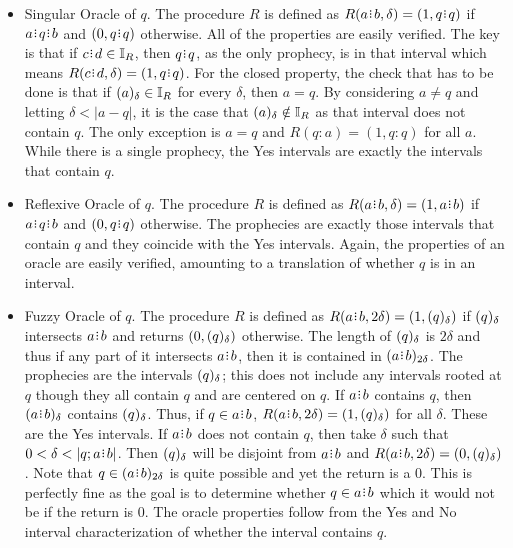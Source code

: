 \documentclass[12pt]{article}
\begin{document}
\begin{itemize}
    \item Singular Oracle of $q$. The procedure $R$ is defined as $R(a \rint b,\delta) = (1, q \rint q)$ if $a \rint q \rint b$ and $(0, q \rint q)$ otherwise. All of the properties are easily verified. The key is that if $c \rint d \in \mathbb{I}_R$, then $q \rint q$, as the only prophecy, is in that interval which means $R(c \rint d, \delta) = (1, q \rint q)$. For the closed property, the check that has to be done is that if $(a)_{\delta} \in \mathbb{I}_R$ for every $\delta$, then $a = q$. By considering $a \neq q$ and letting $\delta < |a-q|$, it is the case that $(a)_{\delta} \notin \mathbb{I}_R$ as that interval does not contain $q$. The only exception is $a = q$ and $R(q:a) =(1, q:q)$ for all $a$. While there is a single prophecy, the Yes intervals are exactly the intervals that contain $q$. 

    \item Reflexive Oracle of $q$. The procedure $R$ is defined as $R(a\rint b, \delta) = (1, a\rint b)$ if $a\rint q \rint b$ and $(0, q \rint q)$ otherwise. The prophecies are exactly those intervals that contain $q$ and they coincide with the Yes intervals. Again, the properties of an oracle are easily verified, amounting to a translation of whether $q$ is in  an interval.
    
    \item Fuzzy Oracle of $q$. The procedure $R$ is defined as $R(a\rint b, 2\delta) = (1, \halo{q})$ if $(q)_{\delta}$ intersects $a\rint b$ and returns $(0, (q)_{\delta})$ otherwise. The length of $(q)_{\delta}$ is $2\delta$ and thus if any part of it intersects $a \rint b$, then it is contained in $\halo[2\delta]{a \rint b}$. The prophecies are the intervals $(q)_{\delta}$; this does not include any intervals rooted at $q$ though they all contain $q$ and are centered on $q$. If $a \rint b$ contains $q$, then $\halo{a \rint b}$ contains $(q)_{\delta}$. Thus, if $q \in a \rint b$, $R(a \rint b, 2\delta) = (1, \halo{q})$ for all $\delta$. These are the Yes intervals. If $a \rint b$ does not contain $q$, then take $\delta$ such that $0 < \delta < |q; a \rint b|$. Then $(q)_{\delta}$ will be disjoint from $a \rint b$ and $R(a \rint b, 2\delta) = (0, \halo{q})$. Note that $q \in \halo[2\delta]{a \rint b}$ is quite possible and yet the return is a $0$. This is perfectly fine as the goal is to determine whether $q \in a \rint b$ which it would not be if the return is 0. The oracle properties follow from the Yes and No interval characterization of whether the interval contains $q$. 
    

\end{itemize}
\end{document}

